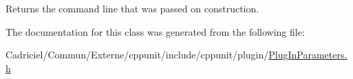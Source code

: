 Returns the command line that was passed on construction. 



The documentation for this class was generated from the following file\-:\begin{DoxyCompactItemize}
\item 
Cadriciel/\-Commun/\-Externe/cppunit/include/cppunit/plugin/\hyperlink{_plug_in_parameters_8h}{Plug\-In\-Parameters.\-h}\end{DoxyCompactItemize}
